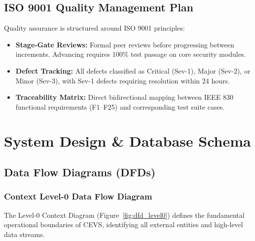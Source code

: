 \documentclass[12pt,a4paper,oneside]{report}
\begin{document}
\section{ISO 9001 Quality Management Plan}
Quality assurance is structured around ISO 9001 principles:
\begin{itemize}
    \item \textbf{Stage-Gate Reviews:} Formal peer reviews before progressing between increments. Advancing requires $100\%$ test passage on core security modules.
    \item \textbf{Defect Tracking:} All defects classified as Critical (Sev-1), Major (Sev-2), or Minor (Sev-3), with Sev-1 defects requiring resolution within 24 hours.
    \item \textbf{Traceability Matrix:} Direct bidirectional mapping between IEEE 830 functional requirements (F1--F25) and corresponding test suite cases.
\end{itemize}

\chapter{System Design \& Database Schema}
\label{chap:design}

\section{Data Flow Diagrams (DFDs)}

\subsection{Context Level-0 Data Flow Diagram}
The Level-0 Context Diagram (Figure~\ref{fig:dfd_level0}) defines the fundamental operational boundaries of CEVS, identifying all external entities and high-level data streams.
\end{document}
